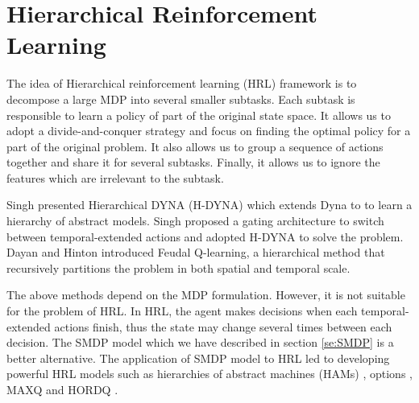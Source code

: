 \section{Hierarchical Reinforcement Learning}
\label{se:HRL}
The idea of Hierarchical reinforcement learning (HRL) framework is to decompose
a large MDP into several smaller subtasks. Each subtask is responsible to
learn a policy of part of the original state space.
It allows us to adopt a divide-and-conquer
strategy and focus on finding the optimal policy for a part of
the original problem.
It also allows us to group a sequence of actions together and share
it for several subtasks. Finally, it allows us to ignore the features which
are irrelevant to the subtask.

Singh \cite{Singh92} presented Hierarchical DYNA (H-DYNA) which extends Dyna to 
to learn a hierarchy of abstract models. Singh proposed a gating architecture to switch 
between temporal-extended actions and adopted H-DYNA to solve the problem. 
Dayan and Hinton \cite{Dayan95} introduced Feudal Q-learning, a hierarchical method that
recursively partitions the problem in both spatial and temporal scale. 

The above methods depend on the MDP formulation. However, it is not suitable for the problem of HRL.
In HRL, the agent makes decisions when each temporal-extended actions finish, thus the state
may change several times between each decision. The SMDP model which we have described
in section \ref{se:SMDP} is a better alternative. The application of SMDP model
to HRL led to developing powerful HRL models such as hierarchies of abstract machines (HAMs)
\cite{HAMQ}, options \cite{SMDP}, MAXQ \cite{MaxQJ} and HORDQ \cite{HORDQ}.



